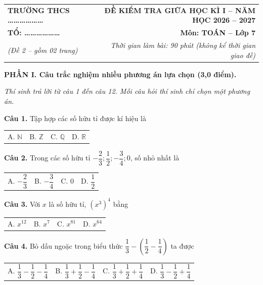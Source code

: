 \documentclass[10.5pt,a4paper]{article}
\begin{document}
\noindent
\begin{tabularx}{\linewidth}{X r}
\textbf{TRƯỜNG THCS \dots\dots\dots\dots\dots\dots} & \textbf{ĐỀ KIỂM TRA GIỮA HỌC KÌ I -- NĂM HỌC 2026 -- 2027} \\
\textbf{TỔ: \dots\dots\dots\dots\dots\dots} & \textbf{Môn: TOÁN -- Lớp 7} \\
\textit{(Đề 2 -- gồm 02 trang)} & \textit{Thời gian làm bài: 90 phút (không kể thời gian giao đề)} \\
\end{tabularx}

\vspace{1mm}
\noindent
{}

\vspace{1.5mm}
\noindent\textbf{\large PHẦN I. Câu trắc nghiệm nhiều phương án lựa chọn (3,0 điểm).}
\vspace{0.5mm}

\noindent\textit{Thí sinh trả lời từ câu 1 đến câu 12. Mỗi câu hỏi thí sinh chỉ chọn một phương án.}

\vspace{1mm}
\noindent\textbf{Câu 1.} Tập hợp các số hữu tỉ được kí hiệu là\\
\begin{tabularx}{\linewidth}{X X X X}
A. $\mathbb{N}$ & B. $\mathbb{Z}$ & C. $\mathbb{Q}$ & D. $\mathbb{R}$
\end{tabularx}

\vspace{1mm}
\noindent\textbf{Câu 2.} Trong các số hữu tỉ $-\dfrac{2}{3}; \dfrac{1}{2}; -\dfrac{3}{4}; 0$, số nhỏ nhất là\\
\begin{tabularx}{\linewidth}{X X X X}
A. $-\dfrac{2}{3}$ & B. $-\dfrac{3}{4}$ & C. $0$ & D. $\dfrac{1}{2}$
\end{tabularx}

\vspace{1mm}
\noindent\textbf{Câu 3.} Với $x$ là số hữu tỉ, $(x^3)^4$ bằng\\
\begin{tabularx}{\linewidth}{X X X X}
A. $x^{12}$ & B. $x^7$ & C. $x^{81}$ & D. $x^{64}$
\end{tabularx}

\vspace{1mm}
\noindent\textbf{Câu 4.} Bỏ dấu ngoặc trong biểu thức $\dfrac{1}{3} - \left(\dfrac{1}{2} - \dfrac{1}{4}\right)$ ta được\\
\begin{tabularx}{\linewidth}{X X X X}
A. $\dfrac{1}{3} - \dfrac{1}{2} - \dfrac{1}{4}$ & B. $\dfrac{1}{3} + \dfrac{1}{2} - \dfrac{1}{4}$ & C. $\dfrac{1}{3} + \dfrac{1}{2} + \dfrac{1}{4}$ & D. $\dfrac{1}{3} - \dfrac{1}{2} + \dfrac{1}{4}$
\end{tabularx}
\end{document}

